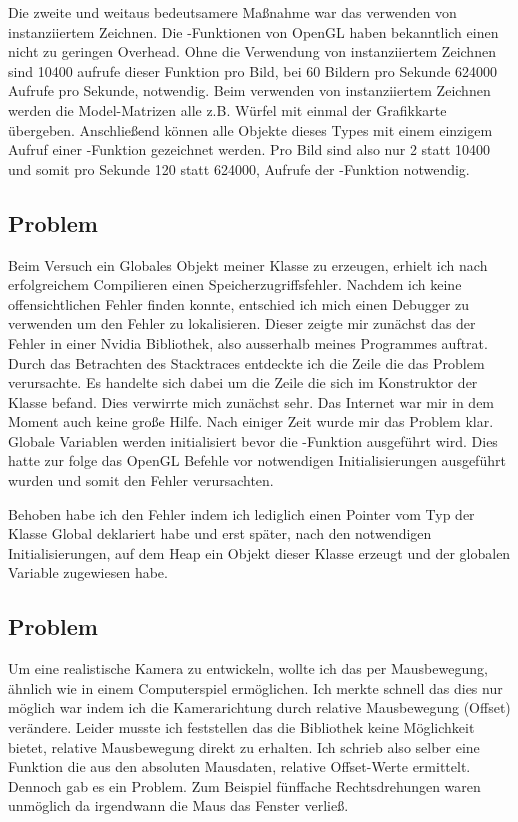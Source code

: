 \documentclass{article}
\begin{document}
Die zweite und weitaus bedeutsamere Maßnahme war das verwenden von instanziiertem Zeichnen.
Die -Funktionen von OpenGL haben bekanntlich einen nicht zu geringen Overhead. Ohne die Verwendung
von instanziiertem Zeichnen sind 10400 aufrufe dieser Funktion pro Bild, bei 60 Bildern pro Sekunde 624000 Aufrufe
pro Sekunde, notwendig. Beim verwenden von instanziiertem Zeichnen werden die Model-Matrizen alle z.B. Würfel mit
einmal der Grafikkarte übergeben. Anschließend können alle Objekte dieses Types mit einem einzigem Aufruf einer
-Funktion gezeichnet werden. Pro Bild sind also nur 2 statt 10400 und somit pro Sekunde 120 statt 624000,
Aufrufe der -Funktion notwendig.

\subsection{Problem}
Beim Versuch ein Globales Objekt meiner Klasse  zu erzeugen, erhielt ich nach erfolgreichem Compilieren
einen Speicherzugriffsfehler. Nachdem ich keine offensichtlichen Fehler finden konnte, entschied ich mich einen
Debugger zu verwenden um den Fehler zu lokalisieren. Dieser zeigte mir zunächst das der Fehler in einer Nvidia
Bibliothek, also ausserhalb meines Programmes auftrat. Durch das Betrachten des Stacktraces entdeckte ich die
Zeile die das Problem verursachte. Es handelte sich dabei um die Zeile 
die sich im Konstruktor der Klasse  befand. Dies verwirrte mich zunächst sehr. Das Internet war mir 
in dem Moment auch keine große Hilfe. Nach einiger Zeit wurde mir das Problem klar. Globale Variablen werden
initialisiert bevor die -Funktion ausgeführt wird. Dies hatte zur folge das OpenGL Befehle vor notwendigen
Initialisierungen ausgeführt wurden und somit den Fehler verursachten.\par\medskip

Behoben habe ich den Fehler indem ich lediglich einen Pointer vom Typ der Klasse  Global deklariert habe
und erst später, nach den notwendigen Initialisierungen, auf dem Heap ein Objekt dieser Klasse erzeugt und der
globalen Variable zugewiesen habe.

\subsection{Problem}
Um eine realistische Kamera zu entwickeln, wollte ich das  per Mausbewegung, ähnlich wie
in einem Computerspiel ermöglichen. Ich merkte schnell das dies nur möglich war indem ich die Kamerarichtung
durch relative Mausbewegung (Offset) verändere. Leider musste ich feststellen das die Bibliothek 
keine Möglichkeit bietet, relative Mausbewegung direkt zu erhalten. Ich schrieb also selber eine Funktion die aus den
absoluten Mausdaten, relative Offset-Werte ermittelt. Dennoch gab es ein Problem. Zum Beispiel fünffache
Rechtsdrehungen waren unmöglich da irgendwann die Maus das Fenster verließ.\par\medskip
\end{document}
